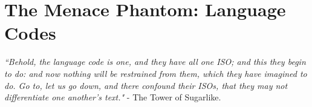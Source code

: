 \documentclass[11pt]{article}
\begin{document}
\section{The Menace Phantom: Language Codes}

\emph{``Behold, the language code is one, and they have all one ISO; and this they begin to do: and now nothing will be restrained from them, which they have imagined to do. Go to, let us go down, and there confound their ISOs, that they may not differentiate one another's text."} - The Tower of Sugarlike.


\
\\
\
\\

{}

\end{document}
